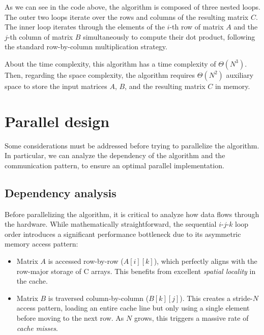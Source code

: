 \documentclass[
  12pt,
]{article}
\providecommand{\tightlist}{%
  \setlength{\itemsep}{0pt}\setlength{\parskip}{0pt}}
\begin{document}
\vspace{0.01\textheight}

As we can see in the code above, the algorithm is composed of three
nested loops. The outer two loops iterate over the rows and columns of
the resulting matrix \(C\). The inner loop iterates through the elements
of the \(i\)-th row of matrix \(A\) and the \(j\)-th column of matrix
\(B\) simultaneously to compute their dot product, following the
standard row-by-column multiplication strategy.

About the time complexity, this algorithm has a time complexity of
\(\Theta(N^3)\). Then, regarding the space complexity, the algorithm
requires \(\Theta(N^2)\) auxiliary space to store the input matrices
\(A\), \(B\), and the resulting matrix \(C\) in memory.

\section{Parallel design}\label{parallel-design}

Some considerations must be addressed before trying to parallelize the
algorithm. In particular, we can analyze the dependency of the algorithm
and the communication pattern, to ensure an optimal parallel
implementation.

\subsection{Dependency analysis}\label{dependency-analysis}

Before parallelizing the algorithm, it is critical to analyze how data
flows through the hardware. While mathematically straightforward, the
sequential \(i\text{-}j\text{-}k\) loop order introduces a significant
performance bottleneck due to its asymmetric memory access pattern:

\begin{itemize}
\tightlist
\item
  Matrix \(A\) is accessed row-by-row (\(A[i][k]\)), which perfectly
  aligns with the row-major storage of C arrays. This benefits from
  excellent \emph{spatial locality} in the cache.
\item
  Matrix \(B\) is traversed column-by-column (\(B[k][j]\)). This creates
  a stride-\(N\) access pattern, loading an entire cache line but only
  using a single element before moving to the next row. As \(N\) grows,
  this triggers a massive rate of \emph{cache misses}.
\end{itemize}
\end{document}
